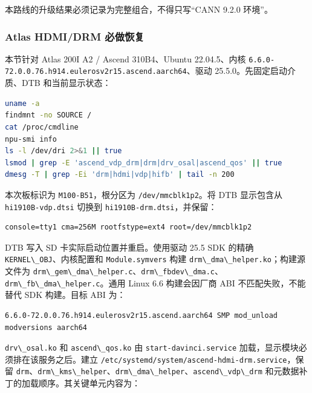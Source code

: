 本路线的升级结果必须记录为完整组合，不得只写``CANN 9.2.0 环境''。

\subsubsection{Atlas HDMI/DRM
必做恢复}\label{atlas-hdmidrm-ux5fc5ux505aux6062ux590d}

本节针对 Atlas 200I A2 / Ascend 310B4、Ubuntu 22.04.5、内核
\passthrough{\lstinline!6.6.0-72.0.0.76.h914.eulerosv2r15.ascend.aarch64!}、驱动
25.5.0。先固定启动介质、DTB 和当前显示状态：

\begin{lstlisting}[language=bash]
uname -a
findmnt -no SOURCE /
cat /proc/cmdline
npu-smi info
ls -l /dev/dri 2>&1 || true
lsmod | grep -E 'ascend_vdp_drm|drm|drv_osal|ascend_qos' || true
dmesg -T | grep -Ei 'drm|hdmi|vdp|hifb' | tail -n 200
\end{lstlisting}

本次板标识为 \passthrough{\lstinline!M100-B51!}，根分区为
\passthrough{\lstinline!/dev/mmcblk1p2!}。将 DTB 显示包含从
\passthrough{\lstinline!hi1910B-vdp.dtsi!} 切换到
\passthrough{\lstinline!hi1910B-drm.dtsi!}，并保留：

\begin{lstlisting}
console=tty1 cma=256M rootfstype=ext4 root=/dev/mmcblk1p2
\end{lstlisting}

DTB 写入 SD 卡实际启动位置并重启。使用驱动 25.5 SDK 的精确
\passthrough{\lstinline!KERNEL\_OBJ!}、内核配置和
\passthrough{\lstinline!Module.symvers!} 构建
\passthrough{\lstinline!drm\_dma\_helper.ko!}；构建源文件为
\passthrough{\lstinline!drm\_gem\_dma\_helper.c!}、\passthrough{\lstinline!drm\_fbdev\_dma.c!}、\passthrough{\lstinline!drm\_fb\_dma\_helper.c!}。通用
Linux 6.6 构建会因厂商 ABI 不匹配失败，不能替代 SDK 构建。目标 ABI 为：

\begin{lstlisting}
6.6.0-72.0.0.76.h914.eulerosv2r15.ascend.aarch64 SMP mod_unload modversions aarch64
\end{lstlisting}

\passthrough{\lstinline!drv\_osal.ko!} 和
\passthrough{\lstinline!ascend\_qos.ko!} 由
\passthrough{\lstinline!start-davinci.service!}
加载，显示模块必须排在该服务之后。建立
\passthrough{\lstinline!/etc/systemd/system/ascend-hdmi-drm.service!}，保留
\passthrough{\lstinline!drm!}、\passthrough{\lstinline!drm\_kms\_helper!}、\passthrough{\lstinline!drm\_dma\_helper!}、\passthrough{\lstinline!ascend\_vdp\_drm!}
和元数据补丁的加载顺序。其关键单元内容为：

